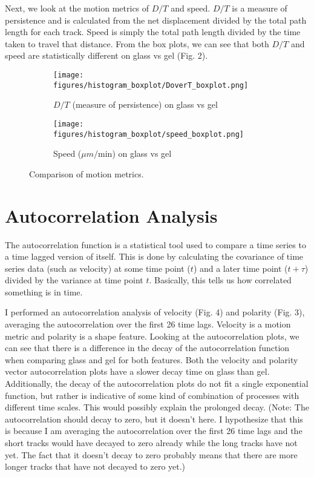 \documentclass[12pt]{article}
\begin{document}
Next, we look at the motion metrics of $D/T$ and speed. $D/T$ is a measure of persistence and is calculated from the net displacement 
divided by the total path length for each track. Speed is simply the total path length divided by the time taken to travel that distance. From the
box plots, we can see that both $D/T$ and speed are statistically different on glass vs gel (Fig. 2). 

\begin{figure}[h!]
  \centering
  \begin{subfigure}[b]{0.4\linewidth}
    \texttt{[image: figures/histogram\_boxplot/DoverT\_boxplot.png]}
    \caption{$D/T$ (measure of persistence) on glass vs gel}
  \end{subfigure}
  \begin{subfigure}[b]{0.4\linewidth}
    \texttt{[image: figures/histogram\_boxplot/speed\_boxplot.png]}
    \caption{Speed ($\mu m/ \text{min}$) on glass vs gel}
  \end{subfigure}
  \caption{Comparison of motion metrics.}
\end{figure}

\section{Autocorrelation Analysis}

The autocorrelation function is a statistical tool used to compare a time series to a time lagged version of itself. This is done by 
calculating the covariance of time series data (such as velocity) at some time point ($t$) and a later time point ($t + \tau$) divided 
by the variance at time point $t$. Basically, this tells us how correlated something is in time. 

I performed an autocorrelation analysis of velocity (Fig. 4) and polarity (Fig. 3), averaging the autocorrelation over the first 26 time lags. Velocity is a motion metric and polarity is a shape feature. Looking at the
autocorrelation plots, we can see that there is a difference in the decay of the autocorrelation function when comparing glass and gel for both features.
Both the velocity and polarity vector autocorrelation plots have a slower decay time on glass than gel. Additionally, the decay of the autocorrelation plots
do not fit a single exponential function, but rather is indicative of some kind of combination of processes with different time scales. This would possibly explain the 
prolonged decay. (Note: The autocorrelation should decay to zero, but it doesn't here. I hypothesize that this is because I am averaging the autocorrelation
over the first 26 time lags and the short tracks would have decayed to zero already while the long tracks have not yet. The fact that it doesn't decay to zero 
probably means that there are more longer tracks that have not decayed to zero yet.)
\end{document}
